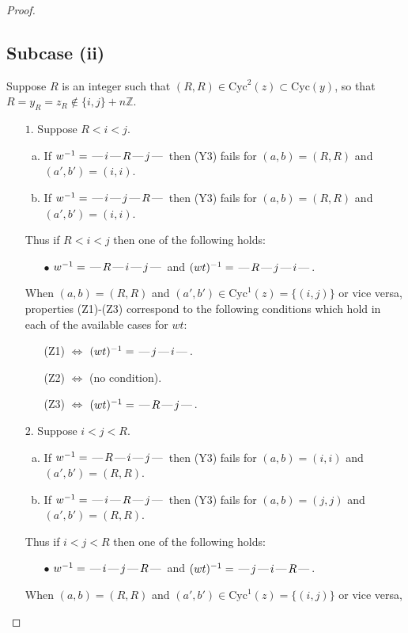 \documentclass[10pt]{article}
\theoremstyle{definition}
\theoremstyle{definition}
\def\dash{\text{\hspace{0.5mm}---\hspace{0.5mm}}}
\def\Cyc{\mathrm{Cyc}}
\begin{document}
\begin{proof}
\subsection{Subcase (ii)}
Suppose $R$ is an integer such that $(R,R) \in \Cyc^2(z)\subset\Cyc(y)$, so that 
$R = y_R = z_R \notin \{i,j\} + n\mathbb{Z}$.
\begin{enumerate}
\item[$1$.] Suppose $R < i < j$.
\begin{enumerate}[(a)]
\item If $w^{-1} = \dash i\dash R\dash j\dash $ then (Y3) fails for $(a,b)=(R,R)$ and $(a',b')=(i,i)$.
\item If $w^{-1} = \dash i\dash j\dash R\dash $ then (Y3) fails for $(a,b)=(R,R)$ and $(a',b')=(i,i)$.
\end{enumerate}
Thus if $R < i < j$ then one of the following holds:
\begin{enumerate}
\item[$\bullet$] $w^{-1} = \dash R\dash i\dash j\dash $ and $(wt)^{-1} = \dash R\dash j\dash i\dash $.
\end{enumerate}
When $(a,b)= (R,R)$ and $(a',b')\in \Cyc^1(z)=\{(i,j)\}$ or vice versa,
properties (Z1)-(Z3) correspond to the following conditions which
hold in each of the available cases for $wt$:
\begin{enumerate}
\item[](Z1) $\Leftrightarrow$ $(wt)^{-1} = \dash j \dash i \dash$.
\item[](Z2) $\Leftrightarrow$ (no condition).
\item[](Z3) $\Leftrightarrow$ $(wt)^{-1} = \dash R \dash j \dash$.
\end{enumerate}
\item[$2$.] Suppose $i < j < R$.
\begin{enumerate}[(a)]
\item If $w^{-1} = \dash R\dash i\dash j\dash $ then (Y3) fails for $(a,b)=(i,i)$ and $(a',b')=(R,R)$.
\item If $w^{-1} = \dash i\dash R\dash j\dash $ then (Y3) fails for $(a,b)=(j,j)$ and $(a',b')=(R,R)$.
\end{enumerate}
Thus if $i < j < R$ then one of the following holds:
\begin{enumerate}
\item[$\bullet$] $w^{-1} = \dash i\dash j\dash R\dash $ and $(wt)^{-1} = \dash j\dash i\dash R\dash $.
\end{enumerate}
When $(a,b)= (R,R)$ and $(a',b')\in \Cyc^1(z)=\{(i,j)\}$ or vice versa,

\end{enumerate}
\end{proof}
\end{document}
